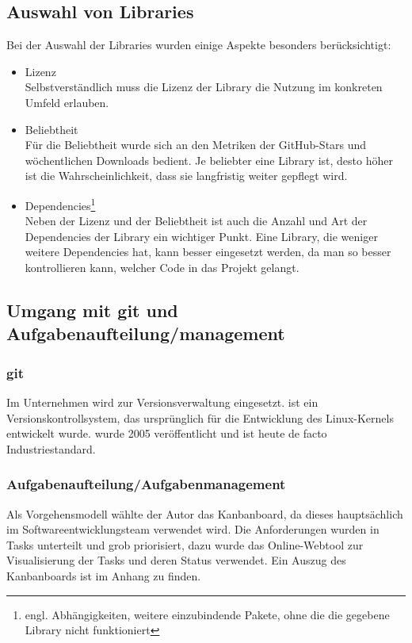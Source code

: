 \subsection{Auswahl von Libraries}

Bei der Auswahl der Libraries wurden einige Aspekte besonders berücksichtigt:

\begin{itemize}
    \item Lizenz\\
    Selbstverständlich muss die Lizenz der Library die Nutzung im konkreten Umfeld erlauben.
    \item Beliebtheit\\
    Für die Beliebtheit wurde sich an den Metriken der GitHub-Stars und wöchentlichen Downloads bedient. Je beliebter eine Library ist, desto höher ist die Wahrscheinlichkeit, dass sie langfristig weiter gepflegt wird.
    \item Dependencies\footnote{engl. Abhängigkeiten, weitere einzubindende Pakete, ohne die die gegebene Library nicht funktioniert}\\
    Neben der Lizenz und der Beliebtheit ist auch die Anzahl und Art der Dependencies der Library ein wichtiger Punkt. Eine Library, die weniger weitere Dependencies hat, kann besser eingesetzt werden, da man so besser kontrollieren kann, welcher Code in das Projekt gelangt.
\end{itemize}

\subsection{Umgang mit git und Aufgabenaufteilung/management}

\subsubsection{git}

Im Unternehmen wird  zur Versionsverwaltung eingesetzt.  ist ein Versionskontrollsystem, das ursprünglich für die Entwicklung des Linux-Kernels entwickelt wurde.  wurde 2005 veröffentlicht und ist heute de facto Industriestandard.

\subsubsection{Aufgabenaufteilung/Aufgabenmanagement}

Als Vorgehensmodell wählte der Autor das Kanbanboard, da dieses hauptsächlich im Softwareentwicklungsteam verwendet wird. Die Anforderungen wurden in Tasks unterteilt und grob priorisiert, dazu wurde das Online-Webtool  zur Visualisierung der Tasks und deren Status verwendet.
Ein Auszug des Kanbanboards ist im Anhang zu finden.\todo



